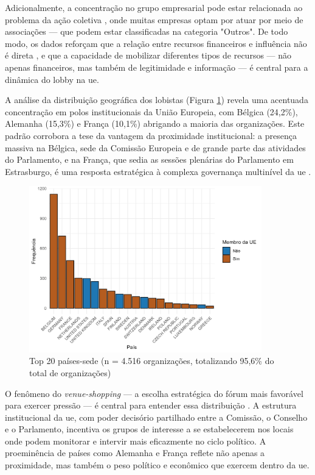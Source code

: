 Adicionalmente, a concentração no grupo empresarial pode estar relacionada ao problema da ação coletiva \cite{olson1971logic}, onde muitas empresas optam por atuar por meio de associações — que podem estar classificadas na categoria "Outros". De todo modo, os dados reforçam que a relação entre recursos financeiros e influência não é direta \cite{simon_notes_1953}, e que a capacidade de mobilizar diferentes tipos de recursos — não apenas financeiros, mas também de legitimidade e informação \cite{Coen2019} — é central para a dinâmica do lobby na \acrshort{ue}.


A análise da distribuição geográfica dos lobistas (Figura \ref{fig:country_distribution}) revela uma acentuada concentração em polos institucionais da União Europeia, com Bélgica (24,2\%), Alemanha (15,3\%) e França (10,1\%) abrigando a maioria das organizações. Este padrão corrobora a tese da vantagem da proximidade institucional: a presença massiva na Bélgica, sede da Comissão Europeia e de grande parte das atividades do Parlamento, e na França, que sedia as sessões plenárias do Parlamento em Estrasburgo, é uma resposta estratégica à complexa governança multinível da \acrshort{ue} \cite{richardson2000government}.

\begin{figure}[!htbp]
\centering
\includegraphics[width=0.9\textwidth]{figures/descriptives_lobbyists/barplot_country_distribution.png}
\caption{Top 20 países-sede (n = 4.516 organizações, totalizando 95,6\% do total de organizações)}
\label{fig:country_distribution}
\end{figure}

O fenômeno do \textit{venue-shopping} — a escolha estratégica do fórum mais favorável para exercer pressão — é central para entender essa distribuição \cite{kluver2015legislative}. A estrutura institucional da \acrshort{ue}, com poder decisório partilhado entre a Comissão, o Conselho e o Parlamento, incentiva os grupos de interesse a se estabelecerem nos locais onde podem monitorar e intervir mais eficazmente no ciclo político. A proeminência de países como Alemanha e França reflete não apenas a proximidade, mas também o peso político e econômico que exercem dentro da \acrshort{ue}.

